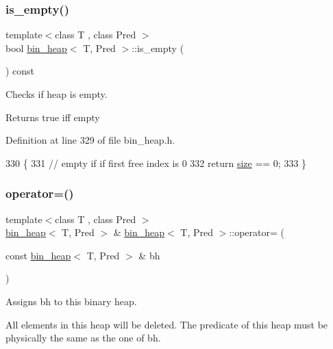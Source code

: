 \subsubsection{\texorpdfstring{is\+\_\+empty()}{is\_empty()}}
{\footnotesize\ttfamily template$<$class T , class Pred $>$ \\
bool \mbox{\hyperlink{classbin__heap}{bin\+\_\+heap}}$<$ T, Pred $>$\+::is\+\_\+empty (\begin{DoxyParamCaption}{ }\end{DoxyParamCaption}) const}



Checks if heap is empty. 

\begin{DoxyReturn}{Returns}
{\ttfamily true} iff empty 
\end{DoxyReturn}


Definition at line 329 of file bin\+\_\+heap.\+h.


\begin{DoxyCode}
330 \{
331     \textcolor{comment}{// empty if if first free index is 0}
332     \textcolor{keywordflow}{return} \mbox{\hyperlink{classbin__heap_a8dde1008dcc24d734dbdb2c7ca50435b}{size}} == 0;
333 \}
\end{DoxyCode}
\mbox{\label{classbin__heap_ad31b6806316a272686015fcbf5f633cd}} 
\subsubsection{\texorpdfstring{operator=()}{operator=()}}
{\footnotesize\ttfamily template$<$class T , class Pred $>$ \\
\mbox{\hyperlink{classbin__heap}{bin\+\_\+heap}}$<$ T, Pred $>$ \& \mbox{\hyperlink{classbin__heap}{bin\+\_\+heap}}$<$ T, Pred $>$\+::operator= (\begin{DoxyParamCaption}\item[{const \mbox{\hyperlink{classbin__heap}{bin\+\_\+heap}}$<$ T, Pred $>$ \&}]{bh }\end{DoxyParamCaption})}



Assigns {\ttfamily bh} to this binary heap. 

All elements in this heap will be deleted. The predicate of this heap must be physically the same as the one of {\ttfamily bh}.


